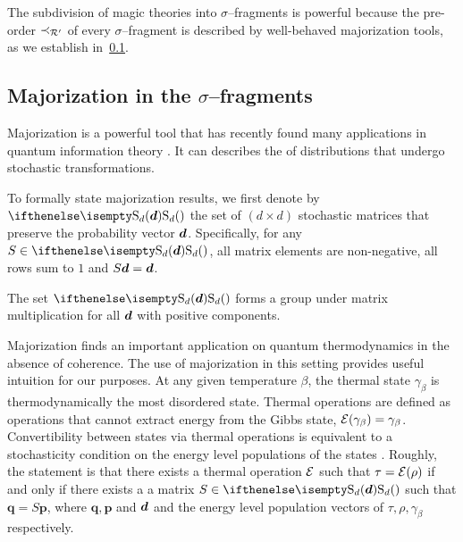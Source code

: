 \documentclass[pra,
aps,
twocolumn,
superscriptaddress,
groupedaddress,
nofootinbib,
reprint
]{revtex4-1}
\begin{document}
The subdivision of magic theories into $\sigma$--fragments is powerful because the pre-order $\prec_{\mathcal{R}'}$ of every $\sigma$--fragment is described by well-behaved majorization tools, as we establish in~\cref{sec:major}. 

\subsection{Majorization in the $\sigma$--fragments}\label{sec:major}

Majorization is a powerful tool that has recently found many applications in quantum information theory .
It can describes the  of distributions that undergo stochastic transformations.

To formally state majorization results, we first denote by $\stoch$ the set of $(d \times d)$ stochastic matrices that preserve the probability vector $\bm{d}$. 
Specifically, for any $S \in \stoch$, all matrix elements are non-negative, all rows sum to $1$ and $S\bm{d} = \bm{d}$.

The set $\stoch$ forms a group under matrix multiplication for all $\bm{d}$ with positive components.

Majorization finds an important application on quantum thermodynamics in the absence of coherence.
The use of majorization in this setting provides useful intuition for our purposes.
At any given temperature $\beta$, the thermal state $\gamma_\beta$ is thermodynamically the most disordered state. 
Thermal operations are defined as operations that cannot extract energy from the Gibbs state, $\mathcal{E}(\gamma_\beta) = \gamma_\beta$.
Convertibility between states via thermal operations is equivalent to a stochasticity condition on the energy level populations of the states .
Roughly, the statement is that there exists a thermal operation $\mathcal{E}$ such that $\tau = \mathcal{E}(\rho)$ if and only if there exists a a matrix $S \in \stoch$ such that $\bm{q} = S\bm{p}$, where $\bm{q}, \bm{p}$ and $\bm{d}$ and the energy level population vectors of $\tau, \rho, \gamma_\beta$ respectively.
\end{document}
